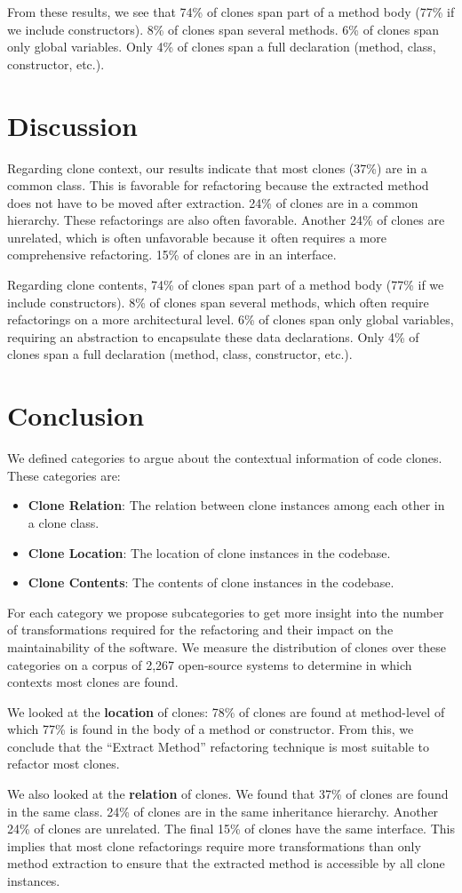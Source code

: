 \documentclass[runningheads]{llncs}
\begin{document}
From these results, we see that 74\% of clones span part of a method body (77\% if we include constructors). 8\% of clones span several methods. 6\% of clones span only global variables. Only 4\% of clones span a full declaration (method, class, constructor, etc.).

\section{Discussion}
Regarding clone context, our results indicate that most clones (37\%) are in a common class. This is favorable for refactoring because the extracted method does not have to be moved after extraction. 24\% of clones are in a common hierarchy. These refactorings are also often favorable. Another 24\% of clones are unrelated, which is often unfavorable because it often requires a more comprehensive refactoring. 15\% of clones are in an interface.

Regarding clone contents, 74\% of clones span part of a method body (77\% if we include constructors). 8\% of clones span several methods, which often require refactorings on a more architectural level. 6\% of clones span only global variables, requiring an abstraction to encapsulate these data declarations. Only 4\% of clones span a full declaration (method, class, constructor, etc.).

\section{Conclusion}
We defined categories to argue about the contextual information of code clones. These categories are:
\begin{itemize}
  \item \textbf{Clone Relation}: The relation between clone instances among each other in a clone class.
  \item \textbf{Clone Location}: The location of clone instances in the codebase.
  \item \textbf{Clone Contents}: The contents of clone instances in the codebase.
\end{itemize}
For each category we propose subcategories to get more insight into the number of transformations required for the refactoring and their impact on the maintainability of the software. We measure the distribution of clones over these categories on a corpus of 2,267 open-source systems to determine in which contexts most clones are found.

We looked at the \textbf{location} of clones: 78\% of clones are found at method-level of which 77\% is found in the body of a method or constructor. From this, we conclude that the ``Extract Method'' refactoring technique is most suitable to refactor most clones.

We also looked at the \textbf{relation} of clones. We found that 37\% of clones are found in the same class. 24\% of clones are in the same inheritance hierarchy. Another 24\% of clones are unrelated. The final 15\% of clones have the same interface. This implies that most clone refactorings require more transformations than only method extraction to ensure that the extracted method is accessible by all clone instances.

%
\printbibliography
\end{document}
